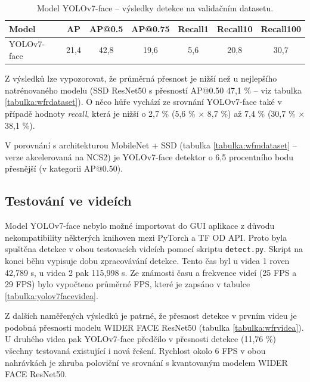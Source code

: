 \begin{table}[H]
  \begin{center}
    \begin{tabular}{|l|c|c|c|c|c|c|}
    \hline
    \rowcolor[HTML]{E0DBDB} 
    \textbf{Model}                      & \textbf{AP} & \textbf{AP@0.5} & \textbf{AP@0.75} & \textbf{Recall1} & \textbf{Recall10} & \textbf{Recall100} \\ \hline
    \cellcolor[HTML]{E0DBDB}YOLOv7-face & 21,4        & 42,8            & 19,6             & 5,6              & 20,8              & 30,7               \\ \hline
    \end{tabular}
    \label{tabulka:yolov7face}
    \caption{Model YOLOv7-face -- výsledky detekce na validačním datasetu.}
  \end{center}
\end{table}

Z výsledků lze vypozorovat, že průměrná přesnost je nižší než u nejlepšího natrénovaného modelu (SSD ResNet50 s přesností AP@0.50 47,1 \% -- viz tabulka \ref{tabulka:wfrdataset}). O něco hůře vychází ze srovnání YOLOv7-face také v případě hodnoty \emph{recall}, která je nižší o 2,7 \% (5,6 \% $\times$ 8,7 \%) až 7,4 \% (30,7 \% $\times$ 38,1 \%). 

V porovnání s architekturou MobileNet + SSD (tabulka \ref{tabulka:wfmdataset} -- verze akcelerovaná na NCS2) je YOLOv7-face detektor o 6,5 procentního bodu přesnější (v kategorii AP@0.50).


\subsection*{Testování ve videích}
Model YOLOv7-face nebylo možné importovat do GUI aplikace z důvodu nekompatibility některých knihoven mezi PyTorch a TF OD API. Proto byla spuštěna detekce v obou testovacích videích pomocí skriptu \texttt{detect.py}. Skript na konci běhu vypisuje dobu zpracovávání detekce. Tento čas byl u videa 1 roven 42,789 s, u videa 2 pak 115,998 s. Ze známosti času a frekvence videí (25 FPS a 29 FPS) bylo vypočteno průměrné FPS, které je zapsáno v tabulce \ref{tabulka:yolov7facevidea}. 

Z dalších naměřených výsledků je patrné, že přesnost detekce v prvním videu je podobná přesnosti modelu WIDER FACE ResNet50 (tabulka \ref{tabulka:wfrvidea}). U druhého videa pak YOLOv7-face předčilo v přesnosti detekce (11,76 \%) všechny testovaná existující i nová řešení. Rychlost okolo 6 FPS v obou nahrávkách je zhruba poloviční ve srovnání s kvantovaným modelem WIDER FACE ResNet50.



